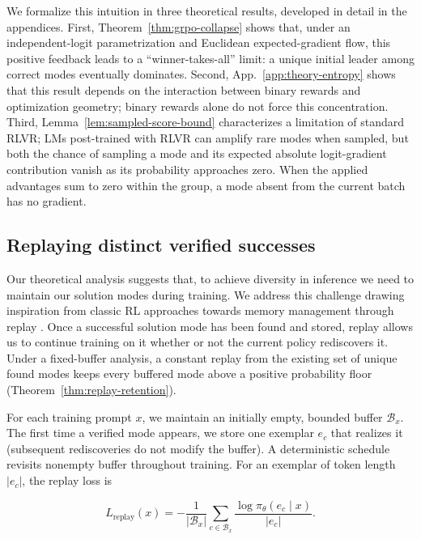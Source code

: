 We formalize this intuition in three theoretical results, developed in detail in the appendices.
First, Theorem~\ref{thm:grpo-collapse} shows that, under an independent-logit parametrization and Euclidean expected-gradient flow, this positive feedback leads to a ``winner-takes-all'' limit: a unique initial leader among correct modes eventually dominates.
Second, App.~\ref{app:theory-entropy} shows that this result depends on the interaction between binary rewards and optimization geometry; binary rewards alone do not force this concentration.
Third, Lemma~\ref{lem:sampled-score-bound} characterizes a limitation of standard RLVR; LMs post-trained with RLVR can amplify rare modes when sampled, but both the chance of sampling a mode and its expected absolute logit-gradient contribution vanish as its probability approaches zero. When the applied advantages sum to zero within the group, a mode absent from the current batch has no gradient.

\subsection{Replaying distinct verified successes}
\label{sec:replay}

Our theoretical analysis suggests that, to achieve diversity in inference we need to maintain our solution modes during training. 
We address this challenge drawing inspiration from classic RL approaches towards memory management through replay \citep{lin1992selfimproving, DBLP:journals/corr/MnihKSGAWR13, rolnick2019replay}. Once a successful solution mode has been found and stored, replay allows us to continue training on it whether or not the current policy rediscovers it.
Under a fixed-buffer analysis, a constant replay from the existing set of unique found modes keeps every buffered mode above a positive probability floor (Theorem~\ref{thm:replay-retention}).

For each training prompt $x$, we maintain an initially empty, bounded buffer $\mathcal B_x$.
The first time a verified mode appears, we store one exemplar $e_c$ that realizes it (subsequent rediscoveries do not modify the buffer).
A deterministic schedule revisits nonempty buffer throughout training.
For an exemplar of token length $|e_c|$, the replay loss is

\begin{equation}
 L_{\mathrm{replay}}(x)=-\frac{1}{|\mathcal B_x|}
 \sum_{c\in\mathcal B_x}\frac{\log\pi_\theta(e_c\mid x)}{|e_c|}.
 \label{eq:lm-verified-replay}
\end{equation}

